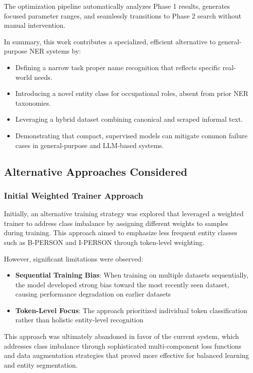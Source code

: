 \documentclass[a4paper]{usiinfbachelorproject}
\begin{document}
The optimization pipeline automatically analyzes Phase 1 results, generates focused parameter ranges, and seamlessly transitions to Phase 2 search without manual intervention.

\vspace{1em}
\noindent
In summary, this work contributes a specialized, efficient alternative to general-purpose NER systems by:
\begin{itemize}
  \item Defining a narrow task proper name recognition that reflects specific real-world needs.
  \item Introducing a novel entity class for occupational roles, absent from prior NER taxonomies.
  \item Leveraging a hybrid dataset combining canonical and scraped informal text.
  \item Demonstrating that compact, supervised models can mitigate common failure cases in general-purpose and LLM-based systems.
\end{itemize}

   \subsection{Alternative Approaches Considered}

\subsubsection{Initial Weighted Trainer Approach}
Initially, an alternative training strategy was explored that leveraged a weighted trainer to address class imbalance by assigning different weights to samples during training. This approach aimed to emphasize less frequent entity classes such as B-PERSON and I-PERSON through token-level weighting.

However, significant limitations were observed:
\begin{itemize}
    \item \textbf{Sequential Training Bias}: When training on multiple datasets sequentially, the model developed strong bias toward the most recently seen dataset, causing performance degradation on earlier datasets
    \item \textbf{Token-Level Focus}: The approach prioritized individual token classification rather than holistic entity-level recognition
\end{itemize}

This approach was ultimately abandoned in favor of the current system, which addresses class imbalance through sophisticated multi-component loss functions and data augmentation strategies that proved more effective for balanced learning and entity segmentation.
\end{document}
